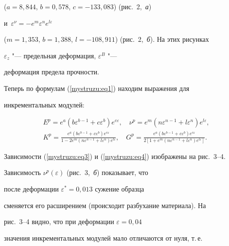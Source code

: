 ($a=8{,}844$, $b=0{,}578$, $c=-133{,}083$) (рис.~2,~{\sl а}) 

и~$\varepsilon^{\nu}=-e^{m} \varepsilon^{n} e^{l \varepsilon}$

($m=1{,}353$, $b=1{,}388$, $l=-108{,}911$) (рис.~2,~{\sl б}). На этих рисунках

$\varepsilon_{z}$ "--- предельная деформация, $\varepsilon^{B}$ "---

деформация предела прочности.







Теперь по формулам (\ref{mystruzu:eq1}) находим выражения для

инкрементальных модулей:

\begin{gather}\label{mystruzu:eq3}

E^{p}=e^{a}(b \varepsilon^{b-1}+c\varepsilon^{b})

e^{c\varepsilon}, \quad \nu^{p}=e^{m}(n \varepsilon^{n-1}

+l\varepsilon^{n})e^{l\varepsilon},\\

\label{mystruzu:eq4}

K^{p}=\frac{e^{a}(b \varepsilon^{b-1}+c\varepsilon^{b})

e^{c\varepsilon}} {1-2e^{m}(n \varepsilon^{n-1}

+l\varepsilon^{n})e^{l\varepsilon}},\quad G^{p}= \frac{e^{a}(b

\varepsilon^{b-1}+c\varepsilon^{b}) e^{c\varepsilon}}{2 \left[

1+e^{m}(n \varepsilon^{n-1} +l\varepsilon^{n}) e^{l\varepsilon}

\right]}.

\end{gather}

Зависимости (\ref{mystruzu:eq3}) и (\ref{mystruzu:eq4}) изображены на рис.~3--4.







Зависимость $\nu^{p}(\varepsilon)$ (рис.~3,~{\sl б}) показывает, что

после деформации $\varepsilon^{\ast}=0{,}013$ сужение образца

сменяется его расширением (происходит разбухание материала). На

рис.~3--4 видно, что при деформации $\varepsilon=0{,}04$

значения инкрементальных модулей мало отличаются от нуля, т.\,е.

